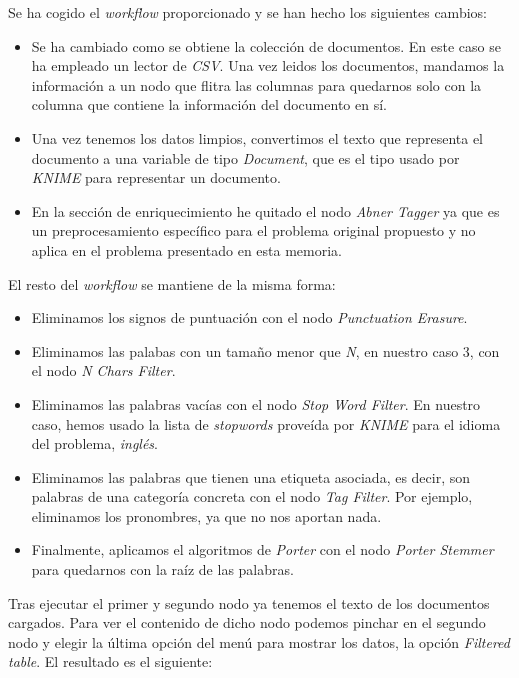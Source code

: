 \documentclass[11pt]{article}
\begin{document}
Se ha cogido el \textit{workflow} proporcionado y se han hecho los siguientes cambios:

\begin{itemize}
	\item Se ha cambiado como se obtiene la colección de documentos. En este caso se ha empleado un lector de \textit{CSV}. Una vez leidos los documentos, mandamos la información a un nodo que flitra las columnas para quedarnos solo con la columna que contiene la información del documento en sí.
	\item Una vez tenemos los datos limpios, convertimos el texto que representa el documento a una variable de tipo \textit{Document}, que es el tipo usado por \textit{KNIME} para representar un documento.
	\item En la sección de enriquecimiento he quitado el nodo \textit{Abner Tagger} ya que es un preprocesamiento específico para el problema original propuesto y no aplica en el problema presentado en esta memoria.
\end{itemize}

El resto del \textit{workflow} se mantiene de la misma forma:
\begin{itemize}
	\item Eliminamos los signos de puntuación con el nodo \textit{Punctuation Erasure}.
	\item Eliminamos las palabas con un tamaño menor que \textit{N}, en nuestro caso $3$, con el nodo \textit{N Chars Filter}.
	\item Eliminamos las palabras vacías con el nodo \textit{Stop Word Filter}. En nuestro caso, hemos usado la lista de \textit{stopwords} proveída por \textit{KNIME} para el idioma del problema, \textit{inglés}.
	\item Eliminamos las palabras que tienen una etiqueta asociada, es decir, son palabras de una categoría concreta con el nodo \textit{Tag Filter}. Por ejemplo, eliminamos los pronombres, ya que no nos aportan nada.
	\item Finalmente, aplicamos el algoritmos de \textit{Porter} con el nodo \textit{Porter Stemmer} para quedarnos con la raíz de las palabras.
\end{itemize}

Tras ejecutar el primer y segundo nodo ya tenemos el texto de los documentos cargados. Para ver el contenido de dicho nodo podemos pinchar en el segundo nodo y elegir la última opción del menú para mostrar los datos, la opción \textit{Filtered table}. El resultado es el siguiente:
\end{document}
